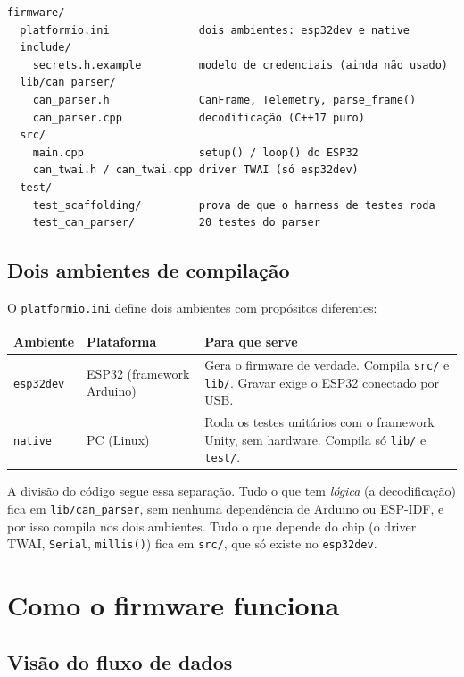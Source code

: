 \documentclass[11pt,a4paper]{article}
\begin{document}
\begin{lstlisting}[caption={Árvore de firmware/ (sem arquivos gerados)}]
firmware/
  platformio.ini              dois ambientes: esp32dev e native
  include/
    secrets.h.example         modelo de credenciais (ainda não usado)
  lib/can_parser/
    can_parser.h              CanFrame, Telemetry, parse_frame()
    can_parser.cpp            decodificação (C++17 puro)
  src/
    main.cpp                  setup() / loop() do ESP32
    can_twai.h / can_twai.cpp driver TWAI (só esp32dev)
  test/
    test_scaffolding/         prova de que o harness de testes roda
    test_can_parser/          20 testes do parser
\end{lstlisting}

\subsection{Dois ambientes de compilação}

O \texttt{platformio.ini} define dois ambientes com propósitos diferentes:

\begin{center}
\begin{tabularx}{\textwidth}{llX}
\toprule
\textbf{Ambiente} & \textbf{Plataforma} & \textbf{Para que serve} \\
\midrule
\texttt{esp32dev} & ESP32 (framework Arduino) & Gera o firmware de verdade. Compila \texttt{src/} e \texttt{lib/}. Gravar exige o ESP32 conectado por USB. \\
\texttt{native} & PC (Linux) & Roda os testes unitários com o framework Unity, sem hardware. Compila só \texttt{lib/} e \texttt{test/}. \\
\bottomrule
\end{tabularx}
\end{center}

A divisão do código segue essa separação. Tudo o que tem \emph{lógica} (a decodificação) fica em \texttt{lib/can\_parser}, sem nenhuma dependência de Arduino ou ESP-IDF, e por isso compila nos dois ambientes. Tudo o que depende do chip (o driver TWAI, \texttt{Serial}, \texttt{millis()}) fica em \texttt{src/}, que só existe no \texttt{esp32dev}.

\section{Como o firmware funciona}

\subsection{Visão do fluxo de dados}
\end{document}
